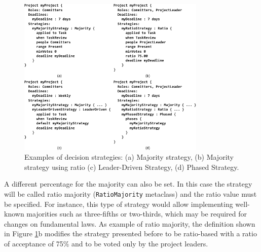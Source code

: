\begin{figure}[t]
\centering
\includegraphics[width=0.8\textwidth]{./figures/strategies}
\caption{Examples of decision strategies: (a) Majority strategy, (b) Majority strategy using ratio (c) Leader-Driven Strategy, (d) Phased Strategy.}
\label{fig:strategies}
\end{figure}


A different percentage for the majority can also be set. In this case the strategy will be called ratio majority (\texttt{RatioMajority} metaclass) and the ratio value must be specified. For instance, this type of strategy would allow implementing well-known majorities such as three-fifths or two-thirds, which may be required for changes on fundamental laws. As example of ratio majority, the definition shown in Figure \ref{fig:strategies}b modifies the strategy presented before to be ratio-based with a ratio of acceptance of 75\% and to be voted only by the project leaders.



